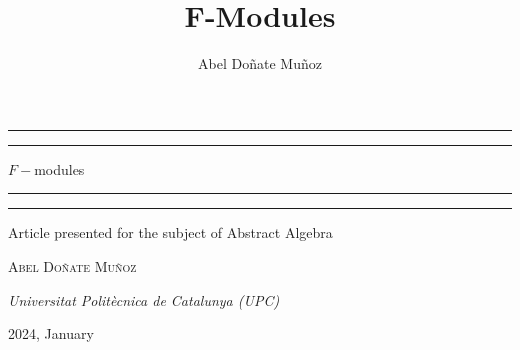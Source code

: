 \documentclass[leqno]{article}
\title{F-Modules}
\author{Abel Doñate Muñoz}
\date{}
\theoremstyle{definition}
\begin{document}
\begin{titlepage} %

	\centering %
	
	\scshape %
	
	\vspace*{\baselineskip} %
	
	
	\rule{\textwidth}{1.6pt}\vspace*{-\baselineskip}\vspace*{2pt} %
	\rule{\textwidth}{0.4pt} %
	
	\vspace{0.75\baselineskip} %
	
	{\LARGE $F-$modules} 
	
	\vspace{0.75\baselineskip} %
	
	\rule{\textwidth}{0.4pt}\vspace*{-\baselineskip}\vspace{3.2pt} %
	\rule{\textwidth}{1.6pt} %
	
	\vspace{2\baselineskip} %
	

	Article presented for the subject of Abstract Algebra
	
	\vspace*{3\baselineskip} %
	

	\vspace{0.5\baselineskip} %
	
	{\scshape\Large Abel Doñate Muñoz} %
	
	\vspace{0.5\baselineskip} %
	
	\textit{Universitat Politècnica de Catalunya (UPC)} %
	
	\vfill %
	
	
	
	\vspace{0.3\baselineskip} %
	
	2024, January %
	

\end{titlepage}
\end{document}
